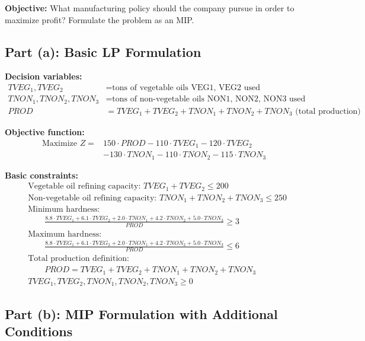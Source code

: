 \documentclass[a4paper,10pt]{article}
\begin{document}
\textbf{Objective:} What manufacturing policy should the company pursue in order to maximize profit? Formulate the problem as an MIP.

\subsection*{Part (a): Basic LP Formulation}

\textbf{Decision variables:}
\begin{align}
TVEG_1, TVEG_2 &= \text{tons of vegetable oils VEG1, VEG2 used}\\
TNON_1, TNON_2, TNON_3 &= \text{tons of non-vegetable oils NON1, NON2, NON3 used}\\
PROD &= TVEG_1 + TVEG_2 + TNON_1 + TNON_2 + TNON_3 \text{ (total production)}
\end{align}

\textbf{Objective function:}
\begin{align}
\text{Maximize } Z = &150 \cdot PROD - 110 \cdot TVEG_1 - 120 \cdot TVEG_2 \\
&- 130 \cdot TNON_1 - 110 \cdot TNON_2 - 115 \cdot TNON_3
\end{align}

\textbf{Basic constraints:}
\begin{align}
&\text{Vegetable oil refining capacity: } TVEG_1 + TVEG_2 \leq 200\\
&\text{Non-vegetable oil refining capacity: } TNON_1 + TNON_2 + TNON_3 \leq 250\\
&\text{Minimum hardness: }\\
&\qquad \frac{8.8 \cdot TVEG_1 + 6.1 \cdot TVEG_2 + 2.0 \cdot TNON_1 + 4.2 \cdot TNON_2 + 5.0 \cdot TNON_3}{PROD} \geq 3\\
&\text{Maximum hardness: }\\
&\qquad \frac{8.8 \cdot TVEG_1 + 6.1 \cdot TVEG_2 + 2.0 \cdot TNON_1 + 4.2 \cdot TNON_2 + 5.0 \cdot TNON_3}{PROD} \leq 6\\
&\text{Total production definition: }\\
&\qquad PROD = TVEG_1 + TVEG_2 + TNON_1 + TNON_2 + TNON_3\\
&TVEG_1, TVEG_2, TNON_1, TNON_2, TNON_3 \geq 0
\end{align}

\subsection*{Part (b): MIP Formulation with Additional Conditions}
\end{document}
